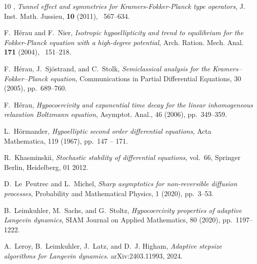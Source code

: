 \documentclass[12pt]{amsart}
\numberwithin{equation}{section}
\numberwithin{figure}{section}
\begin{document}
\begin{thebibliography}{10}
\bysame, {\em Tunnel effect and symmetries for {K}ramers-{F}okker-{P}lanck type operators}, J. Inst. Math. %
Jussieu, \textbf{10} (2011), ~567--634. %

{\sc F.~H\'erau and F.~Nier}, {\em Isotropic hypoellipticity and trend to equilibrium for the {F}okker-{P}lanck equation with a high-degree potential}, Arch. Ration. %
Mech. Anal. \textbf{171} (2004), ~151--218. %

{\sc F.~H\'erau, J.~Sj\"ostrand, and C.~Stolk}, {\em Semiclassical analysis for the {K}ramers–{F}okker–{P}lanck equation}, Communications in Partial Differential Equations, 30 (2005), pp.~689--760.

{\sc F.~Hérau}, {\em Hypocoercivity and exponential time decay for the linear inhomogeneous relaxation {B}oltzmann equation}, Asymptot. Anal., 46 (2006), pp.~349--359.

{\sc L.~Hörmander}, {\em {Hypoelliptic second order differential equations}}, Acta Mathematica, 119 (1967), pp.~147 -- 171.

{\sc R.~Khasminskii}, {\em Stochastic stability of differential equations}, vol.~66, Springer Berlin, Heidelberg, 01 2012.

{\sc D.~Le~Peutrec and L.~Michel}, {\em Sharp asymptotics for non-reversible diffusion processes}, Probability and Mathematical Physics, 1 (2020), pp.~3--53.

{\sc B.~Leimkuhler, M.~Sachs, and G.~Stoltz}, {\em Hypocoercivity properties of adaptive {L}angevin dynamics}, {SIAM Journal on Applied Mathematics}, 80 (2020), pp.~1197--1222.

{\sc A.~Leroy, B.~Leimkuhler, J.~Latz, and D.~J. Higham}, {\em Adaptive stepsize algorithms for {L}angevin dynamics}.
\newblock arXiv:2403.11993, 2024.


\end{thebibliography}
\end{document}
